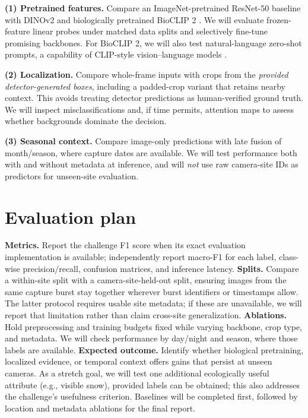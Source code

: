\documentclass[10pt,twocolumn,letterpaper]{article}
\begin{document}
\noindent\textbf{(1) Pretrained features.} Compare an ImageNet-pretrained ResNet-50 baseline with DINOv2 \cite{oquab2024} and biologically pretrained BioCLIP 2 \cite{gu2025}. We will evaluate frozen-feature linear probes under matched data splits and selectively fine-tune promising backbones. For BioCLIP 2, we will also test natural-language zero-shot prompts, a capability of CLIP-style vision--language models \cite{radford2021}.

\noindent\textbf{(2) Localization.} Compare whole-frame inputs with crops from the \emph{provided detector-generated boxes}, including a padded-crop variant that retains nearby context. This avoids treating detector predictions as human-verified ground truth. We will inspect misclassifications and, if time permits, attention maps to assess whether backgrounds dominate the decision.

\noindent\textbf{(3) Seasonal context.} Compare image-only predictions with late fusion of month/season, where capture dates are available. We will test performance both with and without metadata at inference, and will \emph{not} use raw camera-site IDs as predictors for unseen-site evaluation.

\section{Evaluation plan}
\textbf{Metrics.} Report the challenge F1 score when its exact evaluation implementation is available; independently report macro-F1 for each label, class-wise precision/recall, confusion matrices, and inference latency. \textbf{Splits.} Compare a within-site split with a camera-site-held-out split, ensuring images from the same capture burst stay together wherever burst identifiers or timestamps allow. The latter protocol requires usable site metadata; if these are unavailable, we will report that limitation rather than claim cross-site generalization. \textbf{Ablations.} Hold preprocessing and training budgets fixed while varying backbone, crop type, and metadata. We will check performance by day/night and season, where those labels are available. \textbf{Expected outcome.} Identify whether biological pretraining, localized evidence, or temporal context offers gains that persist at unseen cameras. As a stretch goal, we will test one additional ecologically useful attribute (e.g., visible snow), provided labels can be obtained; this also addresses the challenge's usefulness criterion. Baselines will be completed first, followed by location and metadata ablations for the final report.

\clearpage
{\small


}
\end{document}

